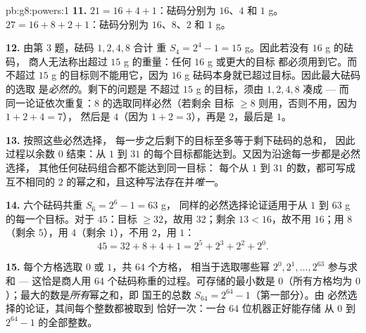 \begin{solution}{pb:g8:powers:1}
\textbf{11.} $21 = 16 + 4 + 1$：砝码分别为 $16$、$4$ 和 $1$ g。
$27 = 16 + 8 + 2 + 1$：砝码分别为 $16$、$8$、$2$ 和 $1$ g。

\textbf{12.} 由第 3 题，砝码 $1, 2, 4, 8$ 合计
重 $S_4 = 2^4 - 1 = 15$ g。因此若没有 $16$ g 的砝码，
商人无法称出超过 $15$ g 的重量：任何 $16$ g 或更大的目标
都必须用到它。而不超过 $15$ g 的目标则不能用它，因为
$16$ g 砝码本身就已超过目标。因此最大砝码的选取
是\emph{必然的}。剩下的问题是
不超过 $15$ g 的目标，须由 $1, 2, 4, 8$ 凑成 --- 而
同一论证依次重复：$8$ 的选取同样必然（若剩余
目标 $\geq 8$ 则用，否则不用，因为 $1 + 2 + 4 = 7$），
然后是 $4$（因为 $1 + 2 = 3$），再是 $2$，最后是 $1$。

\textbf{13.} 按照这些必然选择，
每一步之后剩下的目标至多等于剩下砝码的总和，
因此过程以余数 $0$ 结束：从 $1$ 到
$31$ 的每个目标都能达到。又因为沿途每一步都是必然选择，
其他任何砝码组合都不能达到同一目标：
每个从 $1$ 到 $31$ 的数，都可写成互不相同的
$2$ 的幂之和，且这种写法存在并\emph{唯一}。

\textbf{14.} 六个砝码共重 $S_6 = 2^6 - 1 = 63$ g，
同样的必然选择论证适用于从 $1$ 到
$63$ g 的每一个目标。对于 $45$：目标 $\geq 32$，故用 $32$；剩余
$13 < 16$，故不用 $16$；用 $8$（剩余 $5$），用 $4$（剩余
$1$），不用 $2$，用 $1$：
\[
45 = 32 + 8 + 4 + 1 = 2^5 + 2^3 + 2^2 + 2^0 .
\]

\textbf{15.} 每个方格选取 $0$ 或 $1$，共 $64$ 个方格，
相当于选取哪些幂 $2^0, 2^1, \dots, 2^{63}$ 参与求和
--- 这恰是商人用 $64$
个砝码称重的过程。可存储的最小数是 $0$（所有方格均为
$0$）；最大的数是\emph{所有}幂之和，即
国王的总数 $S_{64} = 2^{64} - 1$（第一部分）。由
必然选择的论证，其间每个整数都被取到
恰好一次：一台 $64$ 位机器正好能存储
从 $0$ 到 $2^{64} - 1$ 的全部整数。
\end{solution}
